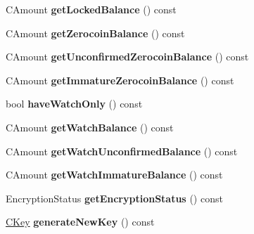 \begin{DoxyCompactItemize}
\item 
\mbox{\label{class_wallet_model_a0fccd88511bce41f226c1c41604347c3}} 
C\+Amount {\bfseries get\+Locked\+Balance} () const
\item 
\mbox{\label{class_wallet_model_a9f75dd612381206f905a74de2c5be93a}} 
C\+Amount {\bfseries get\+Zerocoin\+Balance} () const
\item 
\mbox{\label{class_wallet_model_a33e712aa6733a7bc8bb1a62973ce980a}} 
C\+Amount {\bfseries get\+Unconfirmed\+Zerocoin\+Balance} () const
\item 
\mbox{\label{class_wallet_model_a223e93e413b0c79315e844bee6b8e25c}} 
C\+Amount {\bfseries get\+Immature\+Zerocoin\+Balance} () const
\item 
\mbox{\label{class_wallet_model_ab5e8e946e9ac3ddc9dc6a203e61968e2}} 
bool {\bfseries have\+Watch\+Only} () const
\item 
\mbox{\label{class_wallet_model_a6d9050286d99bccb4a28a8d88f0ca5f8}} 
C\+Amount {\bfseries get\+Watch\+Balance} () const
\item 
\mbox{\label{class_wallet_model_a691b35afd9aff056e1398fd057691ff1}} 
C\+Amount {\bfseries get\+Watch\+Unconfirmed\+Balance} () const
\item 
\mbox{\label{class_wallet_model_a9da743fbe881d4928eeafc48f50ef3d5}} 
C\+Amount {\bfseries get\+Watch\+Immature\+Balance} () const
\item 
\mbox{\label{class_wallet_model_aa89632d2019414f2ab85674cd4d01398}} 
Encryption\+Status {\bfseries get\+Encryption\+Status} () const
\item 
\mbox{\label{class_wallet_model_a4de6fd94203fb5dac370a0b1618d9bdc}} 
\mbox{\hyperlink{class_c_key}{C\+Key}} {\bfseries generate\+New\+Key} () const
\item 
\mbox{\label{class_wallet_model_a6a64730ca8256dd5ec569e26ac758719}} 

\end{DoxyCompactItemize}
